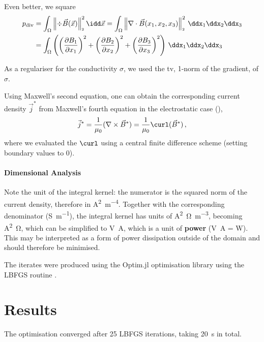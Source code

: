 \documentclass[12pt]{article}
\renewcommand{\norm}[1]{\left\lVert#1\right\rVert_{\scriptscriptstyle 2}}
\begin{document}
  Even better, we square
  \begin{align*}
    p_{\rm div} & = \int_\Omega \norm{\div \vec{B}(\vec{x})}^2 \idd\vec{x} = \int_{\Omega} \norm{\nabla \cdot \vec{B}(x_1, x_2, x_3)}^2 \,\ddx_1\ddx_2\ddx_3                                                             \\
                & = \int_\Omega \left(\left(\frac{\partial B_1}{\partial x_1}\right)^2 + \left(\frac{\partial B_2}{\partial x_2}\right)^2 + \left(\frac{\partial B_3}{\partial x_3}\right)^2\right) \,\ddx_1\ddx_2\ddx_3
  \end{align*}

  As a regulariser for the conductivity $\sigma$, we used the \gls{tv}, 1-norm of the gradient, of $\sigma$.

  Using Maxwell's second equation, one can obtain the corresponding current density $\vec{j}^*$ from Maxwell's fourth equation in the electrostatic case (),
  $$\vec{j}^* = \frac{1}{\mu_0} (\nabla \times \vec{B}^*) = \frac{1}{\mu_0} \curl(\vec{B}^*)\,,$$
  where we evaluated the $\curl$ using a central finite difference scheme (setting boundary values to 0).

  \paragraph{Dimensional Analysis}
  Note the unit of the integral kernel: the numerator is the squared norm of the current density, therefore in \unit{\ampere\squared\per\meter^4}. Together with the corresponding denominator (\unit{\siemens\per\meter}), the integral kernel has units of \unit{\ampere\squared\ohm\per\meter^3}, becoming \unit{\ampere\squared\ohm}, which can be simplified to \unit{\volt\ampere}, which is a unit of \textbf{power} (\unit{\volt\ampere} = \unit{W}).
  This may be interpreted as a form of power dissipation outside of the domain and should therefore be minimised.

  The iterates were produced using the Optim.jl optimisation library \parencite{2018-optim-jl} using the LBFGS routine \parencite{1989-lbfgs}.

  \section{Results}
  \label{sec:results}
  The optimisation converged after 25 LBFGS iterations, taking \SI{20}{\second} in total.
\end{document}
